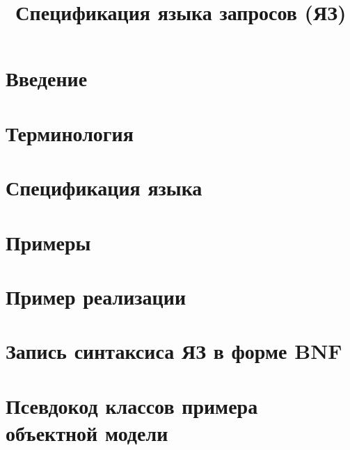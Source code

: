 \documentclass[a4paper,12pt]{article}
\title{Спецификация языка запросов (ЯЗ)}
\date{}
\begin{document}
\maketitle
\tableofcontents

\section{Введение}\label{intro}


\section{Терминология}\label{term}


\section{Спецификация языка}\label{spec}


\section{Примеры}\label{examples}


\section{Пример реализации}\label{impl}


\appendix
\section{Запись синтаксиса ЯЗ в форме BNF}\label{oqlite_bnf}

\section{Псевдокод классов примера объектной модели}\label{son_code}

\end{document}
